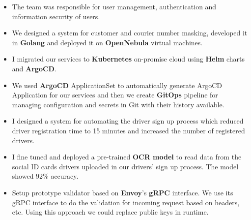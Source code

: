 \vspace{0.5cm}

\begin{itemize}
      \item The team was responsible for user management, authentication and information security of users.
      \item We designed a system for customer and courier number masking, developed it in \textbf{Golang} and deployed it on \textbf{OpenNebula} virtual machines.
      \item I migrated our services to \textbf{Kubernetes} on-promise cloud using \textbf{Helm} charts and \textbf{ArgoCD}.
      \item We used \textbf{ArgoCD} ApplicationSet to automatically generate ArgoCD Application for our services and then we create \textbf{GitOps} pipeline for managing configuration and secrets in Git with their history available.
      \item I designed a system for automating the driver sign up process which reduced driver registration time to 15 minutes and increased the number of registered drivers.
      \item I fine tuned and deployed a pre-trained \textbf{OCR model} to read data from the social ID cards drivers uploaded in our drivers' sign up process. The model showed 92\% accuracy.
      \item Setup prototype validator based on \textbf{Envoy}'s \textbf{gRPC} interface. We use its gRPC interface to do the validation for incoming request
            based on headers, etc. Using this approach we could replace public keys in runtime.
\end{itemize}

\vspace{0.5cm}

